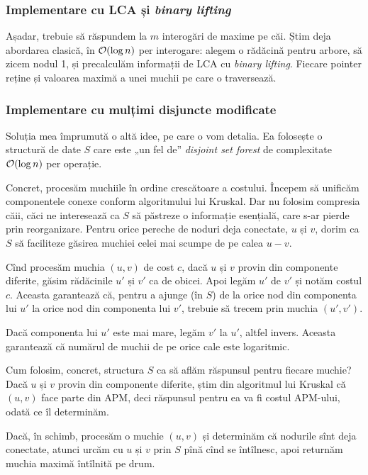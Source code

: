 \documentclass[../main.tex]{subfiles}
\begin{document}
\subsubsection*{Implementare cu LCA și \textit{binary lifting}}

Așadar, trebuie să răspundem la $m$ interogări de maxime pe căi. Știm deja abordarea clasică, în $\mathcal{O}(\log n)$ per interogare: alegem o rădăcină pentru arbore, să zicem nodul 1, și precalculăm informații de LCA cu \textit{binary lifting}. Fiecare pointer reține și valoarea maximă a unei muchii pe care o traversează.

\subsubsection*{Implementare cu mulțimi disjuncte modificate}

Soluția mea împrumută o altă idee, pe care o vom detalia. Ea folosește o structură de date $S$ care este „un fel de” \textit{disjoint set forest} de complexitate $\mathcal{O}(\log n)$ per operație.

Concret, procesăm muchiile în ordine crescătoare a costului. Începem să unificăm componentele conexe conform algoritmului lui Kruskal. Dar nu folosim compresia căii, căci ne interesează ca $S$ să păstreze o informație esențială, care s-ar pierde prin reorganizare. Pentru orice pereche de noduri deja conectate, $u$ și $v$, dorim ca $S$ să faciliteze găsirea muchiei celei mai scumpe de pe calea $u-v$.

Cînd procesăm muchia $(u,v)$ de cost $c$, dacă $u$ și $v$ provin din componente diferite, găsim rădăcinile $u'$ și $v'$ ca de obicei. Apoi legăm $u'$ de $v'$ și notăm costul $c$. Aceasta garantează că, pentru a ajunge (în $S$) de la orice nod din componenta lui $u'$ la orice nod din componenta lui $v'$, trebuie să trecem prin muchia $(u',v')$.

Dacă componenta lui $u'$ este mai mare, legăm $v'$ la $u'$, altfel invers. Aceasta garantează că numărul de muchii de pe orice cale este logaritmic.

Cum folosim, concret, structura $S$ ca să aflăm răspunsul pentru fiecare muchie? Dacă $u$ și $v$ provin din componente diferite, știm din algoritmul lui Kruskal că $(u,v)$ face parte din APM, deci răspunsul pentru ea va fi costul APM-ului, odată ce îl determinăm.

Dacă, în schimb, procesăm o muchie $(u,v)$ și determinăm că nodurile sînt deja conectate, atunci urcăm cu $u$ și $v$ prin $S$ pînă cînd se întîlnesc, apoi returnăm muchia maximă întîlnită pe drum.
\end{document}
